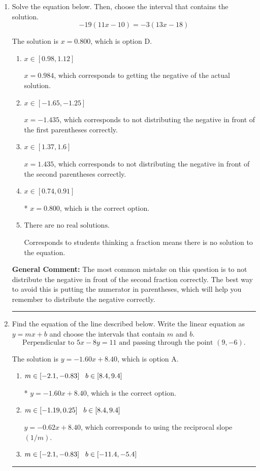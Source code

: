 \documentclass{extbook}[14pt]
\newcommand{\litem}[1]{\item #1

\rule{\textwidth}{0.4pt}}
\begin{document}
\begin{enumerate}\litem{
Solve the equation below. Then, choose the interval that contains the solution.
\[ -19(11x -10) = -3(13x -18) \]

The solution is \( x = 0.800 \), which is option D.\begin{enumerate}[label=\Alph*.]
\item \( x \in [0.98, 1.12] \)

$x = 0.984$, which corresponds to getting the negative of the actual solution.
\item \( x \in [-1.65, -1.25] \)

$x = -1.435$, which corresponds to not distributing the negative in front of the first parentheses correctly.
\item \( x \in [1.37, 1.6] \)

$x = 1.435$, which corresponds to not distributing the negative in front of the second parentheses correctly.
\item \( x \in [0.74, 0.91] \)

* $x = 0.800$, which is the correct option.
\item \( \text{There are no real solutions.} \)

Corresponds to students thinking a fraction means there is no solution to the equation.
\end{enumerate}

\textbf{General Comment:} The most common mistake on this question is to not distribute the negative in front of the second fraction correctly. The best way to avoid this is putting the numerator in parentheses, which will help you remember to distribute the negative correctly.
}
\litem{
Find the equation of the line described below. Write the linear equation as $ y=mx+b $ and choose the intervals that contain $m$ and $b$.
\[ \text{Perpendicular to } 5 x - 8 y = 11 \text{ and passing through the point } (9, -6). \]

The solution is \( y = -1.60x + 8.40 \), which is option A.\begin{enumerate}[label=\Alph*.]
\item \( m \in [-2.1, -0.83] \hspace*{3mm} b \in [8.4, 9.4] \)

* $y = -1.60x + 8.40$, which is the correct option.
\item \( m \in [-1.19, 0.25] \hspace*{3mm} b \in [8.4, 9.4] \)

 $y = -0.62x + 8.40$, which corresponds to using the reciprocal slope $(1/m)$.
\item \( m \in [-2.1, -0.83] \hspace*{3mm} b \in [-11.4, -5.4] \)


\end{enumerate}}
\end{enumerate}
\end{document}
